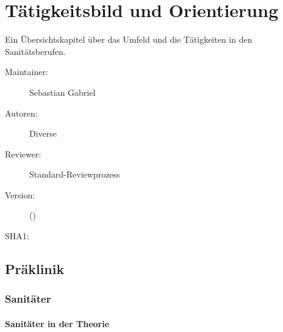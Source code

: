% 
\def\ChapterCode{TAE}
\chapter
[\CO{[TAE]} Tätigkeitsbild und Orientierung]
{Tätigkeitsbild und Orientierung}
\label{chp:TAE}

\ChapterIntro
{%
Ein Übersichtskapitel über das Umfeld und die Tätigkeiten in
den Sanitätsberufen.

}
{%
\begin{description}
  \item[Maintainer:] Sebastian Gabriel
  \item[Autoren:] Diverse
  \item[Reviewer:] Standard-Reviewprozess
  \item[Version:] {\VarDocVersionTypeName} ({\VarDocVersionTypeDescription})
  \item[SHA1:] {\DocGitCommit}
\end{description}

{\TxTeilkapitelAASS}
}



\clearpage
\section{Präklinik}

\subsection{Sanitäter}

\subsubsection{Sanitäter in der Theorie}

